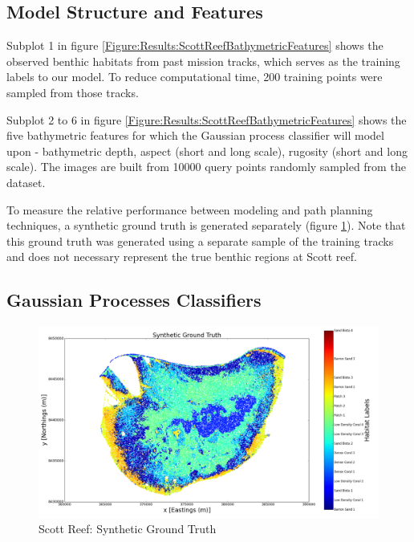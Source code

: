 \documentclass{article}
\begin{document}
	\subsection{Model Structure and Features}
	
		Subplot 1 in figure \ref{Figure:Results:ScottReefBathymetricFeatures} shows the observed benthic habitats from past mission tracks, which serves as the training labels to our model. To reduce computational time, 200 training points were sampled from those tracks.
		
		Subplot 2 to 6 in figure \ref{Figure:Results:ScottReefBathymetricFeatures} shows the five bathymetric features for which the Gaussian process classifier will model upon - bathymetric depth, aspect (short and long scale), rugosity (short and long scale). The images are built from 10000 query points randomly sampled from the dataset.
		
		To measure the relative performance between modeling and path planning techniques, a synthetic ground truth is generated separately (figure \ref{Figure:Results:ScottReefSyntheticTruth}). Note that this ground truth was generated using a separate sample of the training tracks and does not necessary represent the true benthic regions at Scott reef.
	



					
	\subsection{Gaussian Processes Classifiers}
	
		\begin{figure}[!htbp]
		\centering
			\includegraphics[width = \linewidth]{Figures/scott_reef_modeling/Figure7.png}
		\caption{Scott Reef: Synthetic Ground Truth}
		\label{Figure:Results:ScottReefSyntheticTruth}
		\end{figure}
\end{document}
